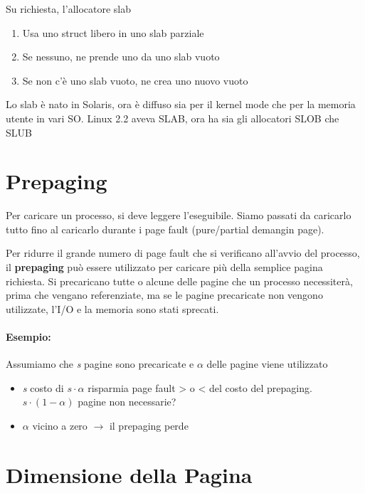 Su richiesta, l'allocatore slab

\begin{enumerate}
  \item Usa uno struct libero in uno slab parziale
  \item Se nessuno, ne prende uno da uno slab vuoto
  \item Se non c'è uno slab vuoto, ne crea uno nuovo vuoto
\end{enumerate}

Lo slab è nato in Solaris, ora è diffuso sia per il kernel mode che per la memoria utente in
vari SO. Linux 2.2 aveva SLAB, ora ha sia gli allocatori SLOB che SLUB


\section{Prepaging}

Per caricare un processo, si deve leggere l'eseguibile. Siamo passati da caricarlo tutto
fino al caricarlo durante i page fault (pure/partial demangin page).


Per ridurre il grande numero di page fault che si verificano all'avvio del processo,
il \textbf{prepaging} può essere utilizzato per caricare più della semplice pagina richiesta.
Si precaricano tutte o alcune delle pagine che un processo necessiterà, prima che vengano referenziate,
ma se le pagine precaricate non vengono utilizzate, l'I/O e la memoria sono stati sprecati.

\paragraph{Esempio: } Assumiamo che \textit{s} pagine sono precaricate e $\alpha$ delle pagine viene
utilizzato

\begin{itemize}
  \item \textit{s} costo di $s \cdot \alpha$ risparmia page fault > o < del costo del prepaging. $s \cdot (1 - \alpha)$ pagine non necessarie?
  \item $\alpha$ vicino a zero $\to$ il prepaging perde
\end{itemize}

\section{Dimensione della Pagina}

